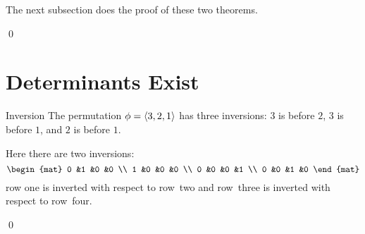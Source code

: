 \documentclass[10pt,t]{beamer}
\begin{document}
\begin{frame}
The next subsection does the proof of 
these two theorems.

\th[th:DetsExist]

\th[th:DeterminantOfAMatrixEqualsDeterminantOfTranspose]

\pause
{}
\pause
\pf
{}
\qed
\end{frame}




\section{Determinants Exist}
\begin{frame}{Inversion}
\df[df:Inversion]
\pause
\ex The permutation $\phi=\langle3,2,1\rangle$ has three inversions:
$3$ is before $2$, $3$ is before $1$, and 
$2$ is before $1$.
\end{frame}
\begin{frame}
\ex
Here there are two inversions:
\begin{equation*}
  \begin{mat}
    0 &1 &0 &0 \\
    1 &0 &0 &0 \\
    0 &0 &0 &1 \\
    0 &0 &1 &0
  \end{mat}
\end{equation*}
row one is inverted with respect to row~two and row~three is inverted with 
respect to row~four.
\end{frame}




\begin{frame}
\lm[le:SwapsChangeSgn]

\pause
\pf
{}
\end{frame}
\begin{frame}
\end{frame}
\begin{frame}
\noindent{}
\qed
\end{frame}
\end{document}
